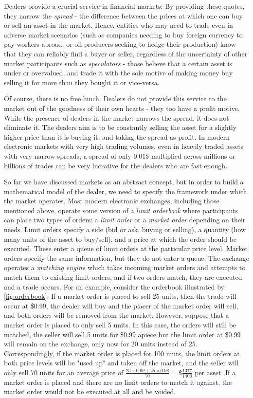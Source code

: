 Dealers provide a crucial service in financial markets: By providing these quotes, they narrow the \textit{spread} - the difference between the prices at which one can buy or sell an asset in the market. Hence, entities who may need to trade even in adverse market scenarios (such as companies needing to buy foreign currency to pay workers abroad, or oil producers seeking to hedge their production) know that they can reliably find a buyer or seller, regardless of the uncertainty of other market participants such as \textit{speculators} - those believe that a certain asset is under or overvalued, and trade it with the sole motive of making money buy selling it for more than they bought it or vice-versa.

Of course, there is no free lunch. Dealers do not provide this service to the market out of the goodness of their own hearts - they too have a profit motive. While the presence of dealers in the market narrows the spread, it does not eliminate it. The dealers aim is to be constantly selling the asset for a slightly higher price than it is buying it, and taking the spread as profit. In modern electronic markets with very high trading volumes, even in heavily traded assets with very narrow spreads, a spread of only 0.01\$ multiplied across millions or billions of trades can be very lucrative for the dealers who are fast enough.

So far we have discussed markets as an abstract concept, but in order to build a mathematical model of the dealer, we need to specify the framework under which the market operates. Most modern electronic exchanges, including those mentioned above, operate some version of a \textit{limit orderbook} where participants can place two types of orders: a \textit{limit order} or a \textit{market order} depending on their needs. Limit orders specify a side (bid or ask, buying or selling), a quantity (how many units of the asset to buy/sell), and a price at which the order should be executed. These enter a queue of limit orders at the particular price level. Market orders specify the same information, but they do not enter a queue: The exchange operates a \textit{matching engine} which takes incoming market orders and attempts to match them to existing limit orders, and if two orders match, they are executed and a trade occurs. For an example, consider the orderbook illustrated by \ref{fig:orderbook}. If a market order is placed to sell 25 units, then the trade will occur at \$0.99, the dealer will buy and the placer of the market order will sell, and both orders will be removed from the market. However, suppose that a market order is placed to only sell 5 units. In this case, the orders will still be matched, the seller will sell 5 units for \$0.99 apiece but the limit order at \$0.99 will remain on the exchange, only now for 20 units instead of 25. Correspondingly, if the market order is placed for 100 units, the limit orders at both price levels will be "used up" and taken off the market, and the seller will only sell 70 units for an average price of $\frac{25\times0.99+45\times0.98}{70}=\$\frac{1377}{1400}$ per asset. If a market order is placed and there are no limit orders to match it against, the market order would not be executed at all and be voided.

